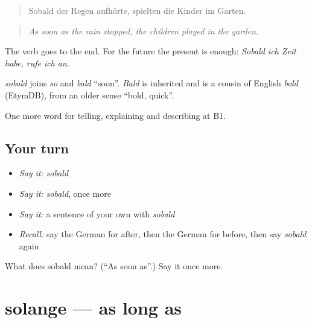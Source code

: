 \begin{quote}
Sobald der Regen aufhörte, spielten die Kinder im Garten.
\end{quote}

\begin{quote}
\emph{As soon as the rain stopped, the children played in the garden.}
\end{quote}

The verb goes to the end. For the future the present is enough: \emph{Sobald ich Zeit habe, rufe ich an}.

\begin{cousinweb}
\emph{sobald} joins \emph{so} and \emph{bald} \textquotedblleft{}soon\textquotedblright{}. \emph{Bald} is inherited and is a cousin of English \emph{bold} (EtymDB), from an older sense \textquotedblleft{}bold, quick\textquotedblright{}.
\end{cousinweb}

\begin{grammarlens}[title={What you've built}]
One more word for telling, explaining and describing at B1.
\end{grammarlens}

\subsection*{Your turn}
\begin{itemize}
\raggedright
  \item \emph{Say it:} \emph{sobald}
  \item \emph{Say it:} \emph{sobald}, once more
  \item \emph{Say it:} a sentence of your own with \emph{sobald}
  \item \emph{Recall:} say the German for after, then the German for before, then say \emph{sobald} again
\end{itemize}

\begin{tcolorbox}[breakable,colback=teal!4,colframe=teal!35!black,title={Before you move on}]
What does sobald mean? (\textquotedblleft{}As soon as\textquotedblright{}.) Say it once more.
\end{tcolorbox}
\section[solange]{solange — as long as}

\label{lesson:GE-C263-solange}



